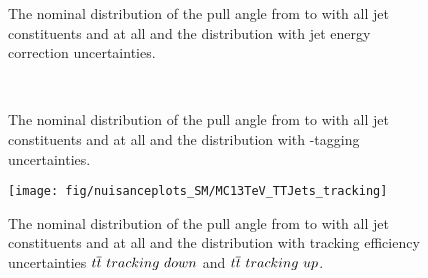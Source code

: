 \begin{description}
\begin{figure}[hbtp]
\end{figure}

  \begin{figure}[hbtp]
  \centering
  \def\twidth{0.45}
  \ContinuedFloat
  \caption{The nominal distribution of the pull angle from \leadingjet to \scndleadingjet with all jet constituents and at all \DeltaR and the distribution with jet energy correction uncertainties.}
\end{figure}

  \begin{figure}[hbtp]
  \def\twidth{0.45}
  \centering
  \hfil
  \\
 \hfil
  \caption{The nominal distribution of the pull angle from \leadingjet to \scndleadingjet with all jet constituents and at all \DeltaR and the distribution with \cPqb-tagging uncertainties.}
  \label{fig:MC13TeV_TTJets_btag_csv}

\end{figure}

\begin{figure}[hbtp]
\centering
\def\twidth{0.45}
\texttt{[image: fig/nuisanceplots\_SM/MC13TeV\_TTJets\_tracking]}
\caption{The nominal distribution of the pull angle from \leadingjet to \scndleadingjet with all jet constituents and at all \DeltaR and the distribution with tracking efficiency uncertainties $\ttbar\ tracking\ down$ and $\ttbar\ tracking\ up$.}
\label{fig:MC13TeV_TTJets_tracking}
\end{figure}

\end{description}
\clearpage
